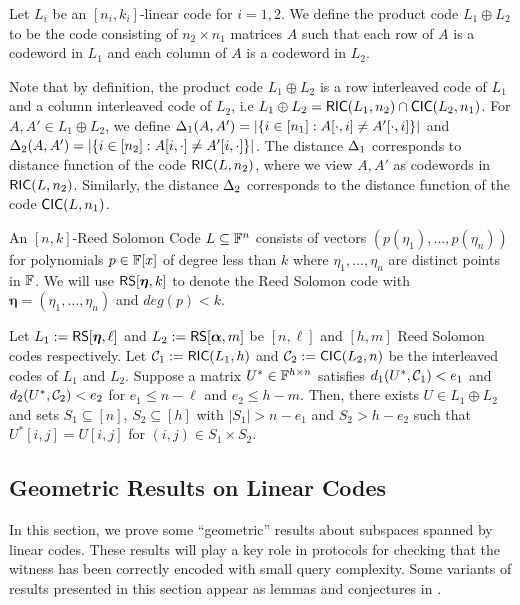 \begin{definition}\label{defn:productcode}
Let $L_i$ be an $[n_i,k_i]$-linear code for $i=1,2$. We define the product code $L_1\oplus L_2$ to be the code consisting of $n_2\times n_1$ matrices $A$ such that each row of $A$ is a codeword in $L_1$ and each column of $A$ is a codeword in $L_2$. 
\end{definition}

Note that by definition, the product code $L_1\oplus L_2$ is a row interleaved code of $L_1$ and a column interleaved code of $L_2$, i.e $L_1\oplus L_2 =
\mathsf{RIC}(L_1,n_2)\cap \mathsf{CIC}(L_2,n_1)$. For $A,A'\in L_1\oplus L_2$, we define $\Delta_1(A,A')=|\{i\in [n_1]: A[\cdot,i]\neq A'[\cdot,i]\}|$ and $\Delta_2(A,A')=|\{i\in
[n_2]: A[i,\cdot]\neq A'[i,\cdot]\}|$. The distance $\Delta_1$ corresponds to distance function of the code $\mathsf{RIC}(L,n_2)$, where we view $A,A'$ as codewords in $\mathsf{RIC}(L,n_2)$. Similarly, the distance $\Delta_2$ corresponds to the distance function of the code $\mathsf{CIC}(L,n_1)$.

\begin{definition}\label{defn:rscode}
An $[n,k]$-Reed Solomon Code $L\subseteq \mathbb{F}^n$ consists of vectors $(p(\eta_1),\ldots,p(\eta_n))$ for polynomials $p\in \mathbb{F}[x]$ of degree less than $k$ where $\eta_1,\ldots,\eta_n$ are distinct points in $\mathbb{F}$. We will use $\mathsf{RS}[\bm{\eta},k]$ to denote the Reed Solomon code with $\bm{\eta}=(\eta_1,\ldots,\eta_n)$ and $deg(p)<k$.
\end{definition}

\begin{lemma}\label{lem:bicdecoding}
Let $L_1 := \mathsf{RS}[\bm{\eta},\ell]$ and $L_2 := \mathsf{RS}[\bm{\alpha},m]$ be $[n,\ell]$ and
$[h,m]$ Reed Solomon codes respectively. Let $\mathcal{C}_1 := \mathsf{RIC}(L_1,h)$ and
$\mathcal{C}_2 := \mathsf{CIC}(L_2,n)$ be the interleaved codes of $L_1$ and $L_2$. Suppose
a matrix $U^\ast\in \mathbb{F}^{h\times n}$ satisfies $d_1(U^\ast,\mathcal{C}_1)<e_1$ and
$d_2(U^\ast,\mathcal{C}_2)<e_2$ for $e_1\leq n-\ell$ and $e_2\leq h-m$. Then, there exists $U\in L_1\oplus L_2$ and sets
$S_1\subseteq [n]$, $S_2\subseteq [h]$ with $|S_1|>n-e_1$ and $S_2>h-e_2$ such
that $U^\ast[i,j]=U[i,j]$ for $(i,j)\in S_1\times S_2$.
\end{lemma}
 

\subsection{Geometric Results on Linear Codes}
In this section, we prove some ``geometric'' results about subspaces spanned by linear codes. 
These results will play a key role in protocols for checking that the witness has been correctly encoded with small query complexity. Some variants of results presented in this section appear as lemmas and conjectures in \cite[Section 4]{ligero}.

